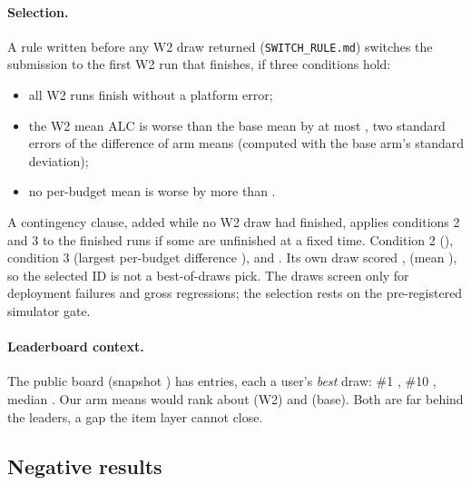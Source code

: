 \documentclass{article}
\begin{document}
\paragraph{Selection.} A rule written before any W2 draw returned (\texttt{SWITCH\_RULE.md}) switches the submission to the first W2 run that finishes, if three conditions hold:
\begin{itemize}
\item[(1)] all \RuleNDraws{} W2 runs finish without a platform error;
\item[(2)] the W2 mean ALC is worse than the base mean by at most \RuleAlcTol{}, two standard errors of the difference of arm means (computed with the base arm's standard deviation);
\item[(3)] no per-budget mean is worse by more than \RuleBudgetTol.
\end{itemize}
A contingency clause, added while no W2 draw had finished, applies conditions 2 and 3 to the finished runs if some are unfinished at a fixed time. Condition 2 \RuleCTwo{} (\ArDiffMean), condition 3 \RuleCThree{} (largest per-budget difference \RuleMaxBudgetDiff), and \RuleCOneSentence. \RuleSelectSentence{} Its own draw scored \SubDrawAlc, \SubDrawRank{} (mean \ArWtwoMean), so the selected ID is not a best-of-draws pick. The draws screen only for deployment failures and gross regressions; the selection rests on the pre-registered simulator gate.

\paragraph{Leaderboard context.} The public board (snapshot \LbDate) has \LbN{} entries, each a user's \emph{best} draw: \#1 \LbFirst, \#10 \LbTenth, median \LbMedian. Our arm means would rank about \LbRankWtwoMean{} (W2) and \LbRankBaseMean{} (base). Both are far behind the leaders, a gap the item layer cannot close.

\subsection{Negative results}
\label{sec:negative}
\end{document}
